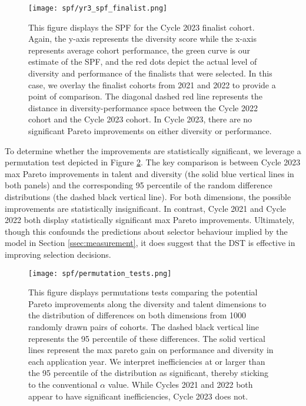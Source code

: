 \begin{figure}[!htb]
    \centering
    \texttt{[image: spf/yr3\_spf\_finalist.png]}
    \caption{This figure displays the SPF for the Cycle 2023 finalist cohort. Again, the y-axis represents the diversity score while the x-axis represents average cohort performance, the green curve is our estimate of the SPF, and the red dots depict the actual level of diversity and performance of the finalists that were selected. In this case, we overlay the finalist cohorts from 2021 and 2022 to provide a point of comparison. The diagonal dashed red line represents the distance in diversity-performance space between the Cycle 2022 cohort and the Cycle 2023 cohort. In Cycle 2023, there are no significant Pareto improvements on either diversity or performance.} 
    \label{fig:spf_2023}
\end{figure}

To determine whether the improvements are statistically significant, we leverage a permutation test depicted in Figure \ref{fig:permutation_tests}. The key comparison is between Cycle 2023 max Pareto improvements in talent and diversity (the solid blue vertical lines in both panels) and the corresponding 95 percentile of the random difference distributions (the dashed black vertical line). For both dimensions, the possible improvements are statistically insignificant. In contrast, Cycle 2021 and Cycle 2022 both display statistically significant max Pareto improvements. Ultimately, though this confounds the predictions about selector behaviour implied by the model in Section \ref{ssec:measurement}, it does suggest that the DST is effective in improving selection decisions.

\begin{figure}[htbp]
    \centering
    \texttt{[image: spf/permutation\_tests.png]} 
    \caption{This figure displays permutations tests comparing the potential Pareto improvements along the diversity and talent dimensions to the distribution of differences on both dimensions from 1000 randomly drawn pairs of cohorts. The dashed black vertical line represents the 95 percentile of these differences. The solid vertical lines represent the max pareto gain on performance and diversity in each application year. We interpret inefficiencies at or larger than the 95 percentile of the distribution as significant, thereby sticking to the conventional $\alpha$ value. While Cycles 2021 and 2022 both appear to have significant inefficiencies, Cycle 2023 does not.}
    \label{fig:permutation_tests}
\end{figure}

